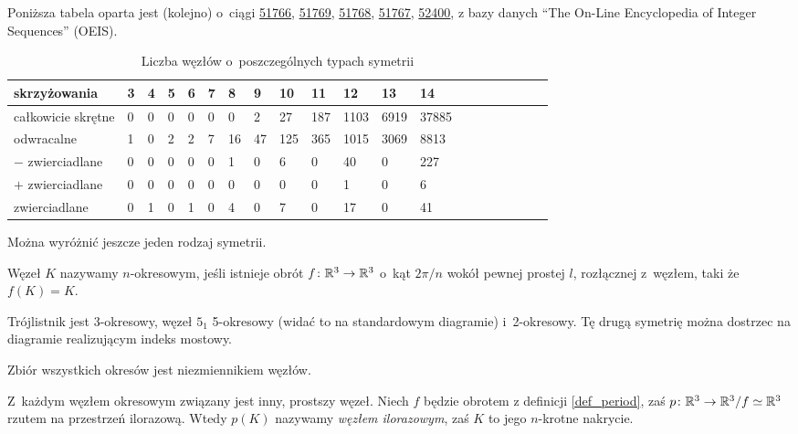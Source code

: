 Poniższa tabela oparta jest (kolejno) o~ciągi
\href{https://oeis.org/A051766}{51766},
\href{https://oeis.org/A051769}{51769},
\href{https://oeis.org/A051768}{51768},
\href{https://oeis.org/A051767}{51767},
\href{https://oeis.org/A052400}{52400},
z bazy danych ``The On-Line Encyclopedia of Integer Sequences'' (OEIS).

\begin{table}[h]
    \centering
    \begin{tabular}{@{}*{20}l@{}} \toprule
        skrzyżowania & 3 & 4 & 5 & 6 & 7 & 8 & 9 & 10 & 11 & 12 & 13 & 14 \\ \midrule
        całkowicie skrętne & 0 & 0 & 0 & 0 & 0 & 0 & 2 & 27 & 187 & 1103 & 6919 & 37885 \\
        odwracalne & 1 & 0 & 2 & 2 & 7 & 16 & 47 & 125 & 365 & 1015 & 3069 & 8813 \\
        $-$ zwierciadlane & 0 & 0 & 0 & 0 & 0 & 1 & 0 & 6 & 0 & 40 & 0 & 227 \\
        $+$ zwierciadlane & 0 & 0 & 0 & 0 & 0 & 0 & 0 & 0 & 0 & 1 & 0 & 6 \\
        zwierciadlane & 0 & 1 & 0 & 1 & 0 & 4 & 0 & 7 & 0 & 17 & 0 & 41 \\
        \bottomrule
        \hline
    \end{tabular}
    \caption{Liczba węzłów o~poszczególnych typach symetrii}
    \label{tablica_wezlow}
\end{table}

Można wyróżnić jeszcze jeden rodzaj symetrii.

\begin{definition} \label{def_period}
    Węzeł $K$ nazywamy $n$-okresowym, jeśli istnieje obrót $f \colon \mathbb R^3 \to \mathbb R^3$ o~kąt $2\pi/n$ wokół pewnej prostej $l$, rozłącznej z~węzłem, taki że $f(K) = K$.
\end{definition}

Trójlistnik jest 3-okresowy, węzeł $5_1$ 5-okresowy (widać to na standardowym diagramie) i~2-okresowy.
Tę drugą symetrię można dostrzec na diagramie realizującym indeks mostowy.

\begin{proposition}
    Zbiór wszystkich okresów jest niezmiennikiem węzłów.
\end{proposition}

Z~każdym węzłem okresowym związany jest inny, prostszy węzeł.
Niech $f$ będzie obrotem z definicji \ref{def_period}, zaś $p \colon \mathbb R^3 \to \mathbb R^3/f \simeq \mathbb R^3$ rzutem na przestrzeń ilorazową.
Wtedy $p(K)$ nazywamy \emph{węzłem ilorazowym}, zaś $K$ to jego $n$-krotne nakrycie.

